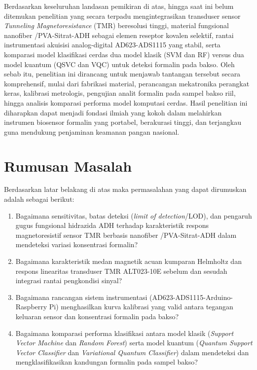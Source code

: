 Berdasarkan keseluruhan landasan pemikiran di atas, hingga saat ini belum ditemukan penelitian yang secara terpadu mengintegrasikan transduser sensor \textit{Tunneling Magnetoresistance} (TMR) beresolusi tinggi, material fungsional nanofiber /PVA-Sitrat-ADH sebagai elemen reseptor kovalen selektif, rantai instrumentasi akuisisi analog-digital AD623-ADS1115 yang stabil, serta komparasi model klasifikasi cerdas dua model klasik (SVM dan RF) versus dua model kuantum (QSVC dan VQC) untuk deteksi formalin pada bakso. Oleh sebab itu, penelitian ini dirancang untuk menjawab tantangan tersebut secara komprehensif, mulai dari fabrikasi material, perancangan mekatronika perangkat keras, kalibrasi metrologis, pengujian analit formalin pada sampel bakso riil, hingga analisis komparasi performa model komputasi cerdas. Hasil penelitian ini diharapkan dapat menjadi fondasi ilmiah yang kokoh dalam melahirkan instrumen biosensor formalin yang portabel, berakurasi tinggi, dan terjangkau guna mendukung penjaminan keamanan pangan nasional.



\section{Rumusan Masalah}
Berdasarkan latar belakang di atas maka permasalahan yang dapat dirumuskan adalah sebagai berikut:
\begin{enumerate}
    \item Bagaimana sensitivitas, batas deteksi (\textit{limit of detection}/LOD), dan pengaruh gugus fungsional hidrazida ADH terhadap karakteristik respons magnetoresistif sensor TMR berbasis nanofiber /PVA-Sitrat-ADH dalam mendeteksi variasi konsentrasi formalin?
    \item Bagaimana karakteristik medan magnetik acuan kumparan Helmholtz dan respons linearitas transduser TMR ALT023-10E sebelum dan sesudah integrasi rantai pengkondisi sinyal?
    \item Bagaimana rancangan sistem instrumentasi (AD623-ADS1115-Arduino-Raspberry Pi) menghasilkan kurva kalibrasi yang valid antara tegangan keluaran sensor dan konsentrasi formalin pada bakso?
    \item Bagaimana komparasi performa klasifikasi antara model klasik (\textit{Support Vector Machine} dan \textit{Random Forest}) serta model kuantum (\textit{Quantum Support Vector Classifier} dan \textit{Variational Quantum Classifier}) dalam mendeteksi dan mengklasifikasikan kandungan formalin pada sampel bakso?
\end{enumerate}


